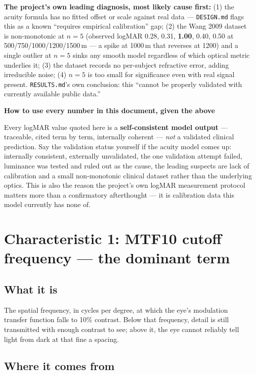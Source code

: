 \documentclass[11pt]{report}
\newenvironment{keybox}[1]%
{\par\vspace{6pt}\begin{lrbox}{\kbsave}\begin{minipage}{0.88\textwidth}%
{\bfseries\color{hbblue}#1}\par\vspace{4pt}\ignorespaces}%
{\end{minipage}\end{lrbox}%
\begin{center}\setlength{\fboxrule}{1.2pt}\setlength{\fboxsep}{7pt}%
\fcolorbox{hbblue}{boxgrey}{\usebox{\kbsave}}\end{center}\vspace{6pt}\par}
\begin{document}
\textbf{The project's own leading diagnosis, most likely cause first:} (1) the acuity formula has no
fitted offset or scale against real data --- \texttt{DESIGN.md} flags this as a known
``requires empirical calibration'' gap; (2) the Wang 2009 dataset is non-monotonic at $n=5$
(observed logMAR 0.28, 0.31, \textbf{1.00}, 0.40, 0.50 at 500/750/1000/1200/1500\,\textmu m --- a spike
at 1000\,\textmu m that reverses at 1200) and a single outlier at $n=5$ sinks any smooth model
regardless of which optical metric underlies it; (3) the dataset records no per-subject refractive
error, adding irreducible noise; (4) $n=5$ is too small for significance even with real signal
present. \texttt{RESULTS.md}'s own conclusion: this ``cannot be properly validated with currently
available public data.''

\begin{keybox}{How to use every number in this document, given the above}
Every logMAR value quoted here is a \textbf{self-consistent model output} --- traceable, cited term
by term, internally coherent --- \emph{not} a validated clinical prediction. Say the validation status
yourself if the acuity model comes up: internally consistent, externally unvalidated, the one
validation attempt failed, luminance was tested and ruled out as the cause, the leading suspects are
lack of calibration and a small non-monotonic clinical dataset rather than the underlying optics. This
is also the reason the project's own logMAR measurement protocol matters more than a confirmatory
afterthought --- it is calibration data this model currently has none of.
\end{keybox}

\chapter{Characteristic 1: MTF10 cutoff frequency --- the dominant term}

\section{What it is}

The spatial frequency, in cycles per degree, at which the eye's modulation transfer function falls to
10\% contrast. Below that frequency, detail is still transmitted with enough contrast to see; above
it, the eye cannot reliably tell light from dark at that fine a spacing.

\section{Where it comes from}
\end{document}
